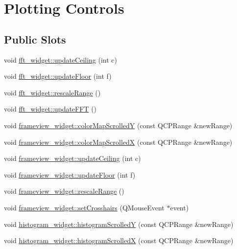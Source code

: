 \hypertarget{group__plotfunc}{\section{Plotting Controls}
\label{group__plotfunc}
}
\subsection*{Public Slots}
\begin{DoxyCompactItemize}
\item 
void \hyperlink{group__plotfunc_gafb6e441944ce7497cfbeeed7e8d3d65c}{fft\+\_\+widget\+::update\+Ceiling} (int c)
\item 
void \hyperlink{group__plotfunc_gadfd68dfa066e8e0d0bf69324176e01a4}{fft\+\_\+widget\+::update\+Floor} (int f)
\item 
void \hyperlink{group__plotfunc_ga41f5dca22060a42641755916903aa6fa}{fft\+\_\+widget\+::rescale\+Range} ()
\item 
void \hyperlink{group__plotfunc_ga2f62c754ab9b5df0aa7e4bc7b0ddc63b}{fft\+\_\+widget\+::update\+F\+F\+T} ()
\item 
void \hyperlink{group__plotfunc_ga3074750f0969ffba239e316765643032}{frameview\+\_\+widget\+::color\+Map\+Scrolled\+Y} (const Q\+C\+P\+Range \&new\+Range)
\item 
void \hyperlink{group__plotfunc_ga10c1c059252f3646085daa6a0fd772ca}{frameview\+\_\+widget\+::color\+Map\+Scrolled\+X} (const Q\+C\+P\+Range \&new\+Range)
\item 
void \hyperlink{group__plotfunc_gad4ef028cf39c4fcccf7946b6c92bb354}{frameview\+\_\+widget\+::update\+Ceiling} (int c)
\item 
void \hyperlink{group__plotfunc_ga5cf94e8bd5b9b341685fd7c29944373e}{frameview\+\_\+widget\+::update\+Floor} (int f)
\item 
void \hyperlink{group__plotfunc_gaed72318cf7ec830f9ce3f5d314bc0f8c}{frameview\+\_\+widget\+::rescale\+Range} ()
\item 
void \hyperlink{group__plotfunc_gac7f78be091830f38f239480f29dfe869}{frameview\+\_\+widget\+::set\+Crosshairs} (Q\+Mouse\+Event $\ast$event)
\item 
void \hyperlink{group__plotfunc_ga97e017f73cc11f779e8c79105d8aea43}{histogram\+\_\+widget\+::histogram\+Scrolled\+Y} (const Q\+C\+P\+Range \&new\+Range)
\item 
void \hyperlink{group__plotfunc_gaee461cb6e6adc4eca240bac3ed00b3a8}{histogram\+\_\+widget\+::histogram\+Scrolled\+X} (const Q\+C\+P\+Range \&new\+Range)

\end{DoxyCompactItemize}
